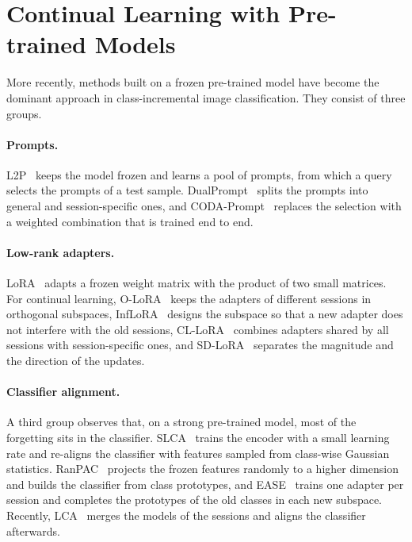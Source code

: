 \section{Continual Learning with Pre-trained Models}
\label{sec:c2-s6}

More recently, methods built on a frozen pre-trained model have become the dominant
approach in class-incremental image classification. They consist of three groups.

\paragraph{Prompts.} L2P~\citep{wang2022l2p} keeps the model frozen and learns a pool of
prompts, from which a query selects the prompts of a test sample.
DualPrompt~\citep{wang2022dualprompt} splits the prompts into general and
session-specific ones, and CODA-Prompt~\citep{smith2023coda} replaces the selection with a
weighted combination that is trained end to end.

\paragraph{Low-rank adapters.} LoRA~\citep{hu2022lora} adapts a frozen weight matrix with
the product of two small matrices. For continual learning, O-LoRA~\citep{wang2023olora}
keeps the adapters of different sessions in orthogonal subspaces,
InfLoRA~\citep{liang2024inflora} designs the subspace so that a new adapter does not
interfere with the old sessions, CL-LoRA~\citep{he2025cllora} combines adapters shared by
all sessions with session-specific ones, and SD-LoRA~\citep{wu2025sdlora} separates the
magnitude and the direction of the updates.

\paragraph{Classifier alignment.} A third group observes that, on a strong pre-trained
model, most of the forgetting sits in the classifier. SLCA~\citep{zhang2023slca} trains the
encoder with a small learning rate and re-aligns the classifier with features sampled from
class-wise Gaussian statistics. RanPAC~\citep{mcdonnell2023ranpac} projects the frozen
features randomly to a higher dimension and builds the classifier from class prototypes,
and EASE~\citep{zhou2024ease} trains one adapter per session and completes the prototypes
of the old classes in each new subspace. Recently, LCA~\citep{lca2026} merges the models of
the sessions and aligns the classifier afterwards.

